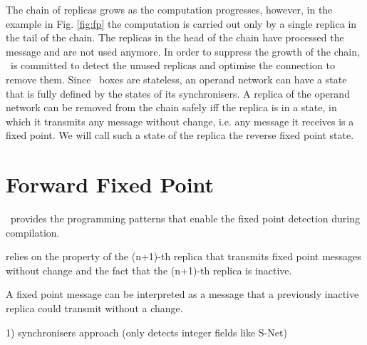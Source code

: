 The chain of replicas grows as the computation progresses, however, in the example in Fig. \ref{fig:fp} the computation is carried out only by a single replica in the tail of the chain. The replicas in the head of the chain have processed the message and are not used anymore. In order to suppress the growth of the chain, \ak\ is committed to detect the unused replicas and optimise the connection to remove them. Since \ak\ boxes are stateless, an operand network can have a state that is fully defined by the states of its synchronisers. A replica of the operand network can be removed from the chain safely iff the replica is in a state, in which it transmits any message without change, i.e. any message it receives is a fixed point. We will call such a state of the replica the reverse fixed point state.




%



    \section{Forward Fixed Point}
\ak\ provides the programming patterns that enable the fixed point detection during compilation.

relies on the property of the (n+1)-th replica that transmits fixed point messages without change and the fact that the (n+1)-th replica is inactive.

A fixed point message can be interpreted as a message that a previously inactive replica could transmit without a change. 


%
%

1) synchronisers approach (only detects integer fields like S-Net)

